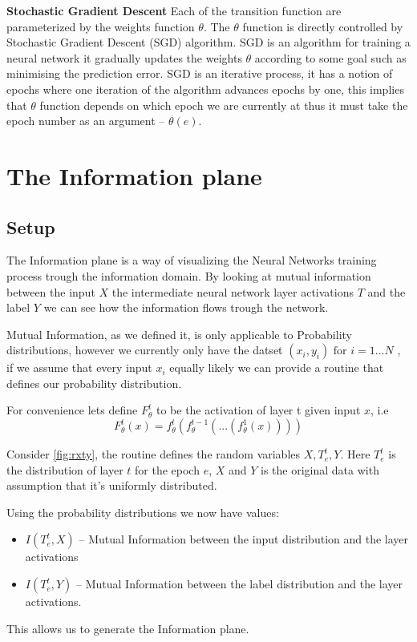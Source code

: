 \textbf{Stochastic Gradient Descent} Each of the transition function are
parameterized by the weights function $\theta$. The $\theta$ function is
directly controlled by Stochastic Gradient Descent (SGD) algorithm.  SGD is an
algorithm for training a neural network it gradually updates the weights
$\theta$ according to some goal such as minimising the prediction error.  SGD is
an iterative process, it has a notion of epochs where one iteration of the
algorithm advances epochs by one, this implies that $\theta$ function depends on
which epoch we are currently at thus it must take the epoch number as an
argument -- $\theta(e)$.

\section{The Information plane}

\subsection{Setup}

The Information plane is a way of visualizing the Neural Networks training
process trough the information domain. By looking at mutual information between
the input $X$ the intermediate neural network layer activations $T$ and the
label $Y$ we can see how the information flows trough the network.

Mutual Information, as we defined it, is only applicable to Probability
distributions, however we currently only have the datset 
$(x_i, y_i) \text{ for } i = 1...N$
, if we assume that every input $x_i$ equally likely we can provide a routine
that defines our probability distribution.

For convenience lets define $F_{\theta}^t$ to be the activation of layer t given
input $x$, i.e
$$F_{\theta}^t(x) = f_{\theta}^t(f_{\theta}^{t-1}(...(f_{\theta}^1(x))))$$


Consider \autoref{fig:rxty}, the routine defines the random variables
$X,T_e^t,Y$. Here $T_e^t$ is the distribution of layer $t$ for the epoch $e$,
$X$ and $Y$ is the original data with assumption that it's uniformly
distributed. 

Using the probability distributions we now have values:
\begin{itemize}
  \item{
      $I(T_e^t, X)$ -- Mutual Information between the input distribution and the
      layer activations 
    }
  \item{
      $I(T_e^t, Y)$ -- Mutual Information between the label distribution and the
      layer activations.
    }
\end{itemize}
This allows us to generate the Information plane.


